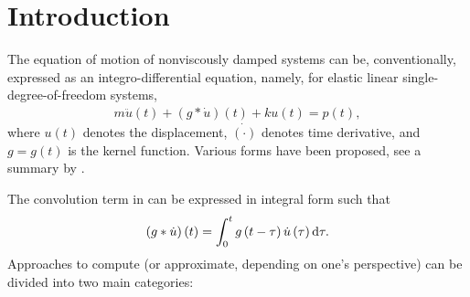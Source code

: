 \section{Introduction}
The equation of motion of nonviscously damped systems can be, conventionally, expressed as an integro-differential equation, namely, for elastic linear single-degree-of-freedom systems,
\begin{gather}\label{eq:single_eom}
m\ddot{u}\left(t\right)+\left(g*\dot{u}\right)\left(t\right)+ku\left(t\right)=p\left(t\right),
\end{gather}
where $u(t)$ denotes the displacement, $\dot{(\cdot)}$ denotes time derivative, and $g=g(t)$ is the kernel function. Various forms have been proposed, see a summary by \citet[][Table 1.1]{Adhikari2014}.

The convolution term in  can be expressed in integral form such that
\begin{gather}\label{eq:conv}
\left(g*\dot{u}\right)\left(t\right)=\int_0^tg\left(t-\tau\right)\dot{u}\left(\tau\right)\mathrm{d}\tau.
\end{gather}
Approaches to compute (or approximate, depending on one's perspective)  can be divided into two main categories:
